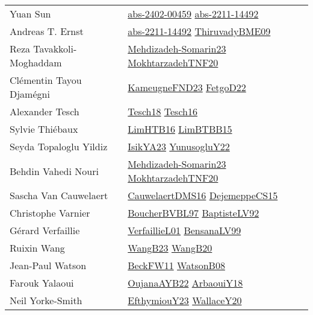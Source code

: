 {\begin{longtable}{p{4cm}p{20cm}}
Yuan Sun & \href{articles/abs-2402-00459.pdf}{abs-2402-00459}\cite{abs-2402-00459} \href{articles/abs-2211-14492.pdf}{abs-2211-14492}\cite{abs-2211-14492} \\
Andreas T. Ernst & \href{articles/abs-2211-14492.pdf}{abs-2211-14492}\cite{abs-2211-14492} \href{papers/ThiruvadyBME09.pdf}{ThiruvadyBME09}\cite{ThiruvadyBME09} \\
Reza Tavakkoli{-}Moghaddam & \href{papers/Mehdizadeh-Somarin23.pdf}{Mehdizadeh-Somarin23}\cite{Mehdizadeh-Somarin23} \href{}{MokhtarzadehTNF20}\cite{MokhtarzadehTNF20} \\
Cl{\'{e}}mentin Tayou Djam{\'{e}}gni & \href{papers/KameugneFND23.pdf}{KameugneFND23}\cite{KameugneFND23} \href{articles/FetgoD22.pdf}{FetgoD22}\cite{FetgoD22} \\
Alexander Tesch & \href{papers/Tesch18.pdf}{Tesch18}\cite{Tesch18} \href{papers/Tesch16.pdf}{Tesch16}\cite{Tesch16} \\
Sylvie Thi{\'{e}}baux & \href{papers/LimHTB16.pdf}{LimHTB16}\cite{LimHTB16} \href{papers/LimBTBB15.pdf}{LimBTBB15}\cite{LimBTBB15} \\
Seyda Topaloglu Yildiz & \href{articles/IsikYA23.pdf}{IsikYA23}\cite{IsikYA23} \href{}{YunusogluY22}\cite{YunusogluY22} \\
Behdin Vahedi Nouri & \href{papers/Mehdizadeh-Somarin23.pdf}{Mehdizadeh-Somarin23}\cite{Mehdizadeh-Somarin23} \href{}{MokhtarzadehTNF20}\cite{MokhtarzadehTNF20} \\
Sascha Van Cauwelaert & \href{papers/CauwelaertDMS16.pdf}{CauwelaertDMS16}\cite{CauwelaertDMS16} \href{papers/DejemeppeCS15.pdf}{DejemeppeCS15}\cite{DejemeppeCS15} \\
Christophe Varnier & \href{}{BoucherBVBL97}\cite{BoucherBVBL97} \href{papers/BaptisteLV92.pdf}{BaptisteLV92}\cite{BaptisteLV92} \\
G{\'{e}}rard Verfaillie & \href{papers/VerfaillieL01.pdf}{VerfaillieL01}\cite{VerfaillieL01} \href{articles/BensanaLV99.pdf}{BensanaLV99}\cite{BensanaLV99} \\
Ruixin Wang & \href{papers/WangB23.pdf}{WangB23}\cite{WangB23} \href{papers/WangB20.pdf}{WangB20}\cite{WangB20} \\
Jean{-}Paul Watson & \href{}{BeckFW11}\cite{BeckFW11} \href{papers/WatsonB08.pdf}{WatsonB08}\cite{WatsonB08} \\
Farouk Yalaoui & \href{papers/OujanaAYB22.pdf}{OujanaAYB22}\cite{OujanaAYB22} \href{papers/ArbaouiY18.pdf}{ArbaouiY18}\cite{ArbaouiY18} \\
Neil Yorke{-}Smith & \href{papers/EfthymiouY23.pdf}{EfthymiouY23}\cite{EfthymiouY23} \href{articles/WallaceY20.pdf}{WallaceY20}\cite{WallaceY20} \\

\end{longtable}}
